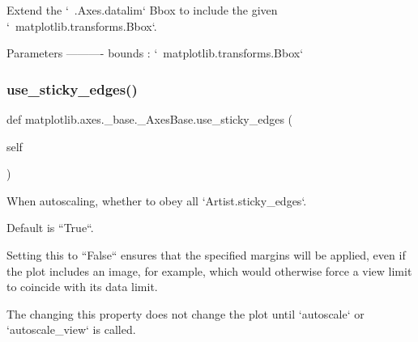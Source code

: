\begin{DoxyVerb}Extend the `~.Axes.datalim` Bbox to include the given
`~matplotlib.transforms.Bbox`.

Parameters
----------
bounds : `~matplotlib.transforms.Bbox`
\end{DoxyVerb}
 \mbox{\label{classmatplotlib_1_1axes_1_1__base_1_1__AxesBase_a6ad895824dbe2df1e84ed59622c729d7}} 
\subsubsection{\texorpdfstring{use\+\_\+sticky\+\_\+edges()}{use\_sticky\_edges()}\hspace{0.1cm}{\footnotesize\ttfamily [1/2]}}
{\footnotesize\ttfamily def matplotlib.\+axes.\+\_\+base.\+\_\+\+Axes\+Base.\+use\+\_\+sticky\+\_\+edges (\begin{DoxyParamCaption}\item[{}]{self }\end{DoxyParamCaption})}

\begin{DoxyVerb}When autoscaling, whether to obey all `Artist.sticky_edges`.

Default is ``True``.

Setting this to ``False`` ensures that the specified margins
will be applied, even if the plot includes an image, for
example, which would otherwise force a view limit to coincide
with its data limit.

The changing this property does not change the plot until
`autoscale` or `autoscale_view` is called.
\end{DoxyVerb}
 \mbox{\label{classmatplotlib_1_1axes_1_1__base_1_1__AxesBase_abbaae57f9b1937f0a7aa073064ce82df}} 
